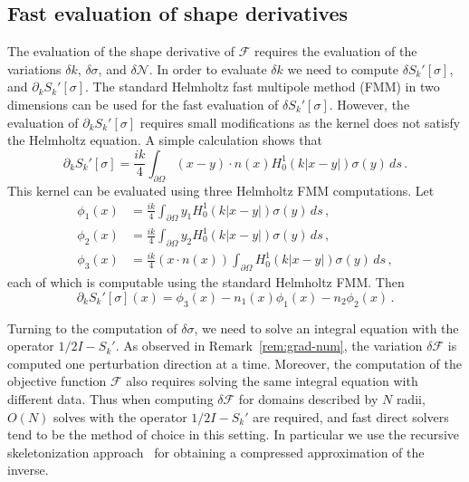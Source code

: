 \documentclass{amsart}
\theoremstyle{plain}
\begin{document}
\subsection{Fast evaluation of shape derivatives}
The evaluation of the shape derivative of $\mathcal{F}$ requires the evaluation of the variations $\delta k$, $\delta \sigma$, and $\delta \mathcal{N}$. 
In order to evaluate $\delta k$ we need to compute $\delta S_{k}'[\sigma]$, and $\partial_{k} S_{k}'[\sigma]$. The standard Helmholtz fast multipole method (FMM) in two
dimensions can be used for the fast evaluation of $\delta S_{k}'[\sigma]$. However, 
the evaluation of $\partial_{k} S_{k}'[\sigma]$ requires small modifications as the kernel does not satisfy the Helmholtz equation.
A simple calculation shows that
\begin{equation}
\partial_{k} S_{k}'[\sigma] = \frac{ik}{4}\int_{\partial \Omega}  (x-y)\cdot n(x) H_{0}^{1}(k|x-y|)\sigma(y) \, ds\,.
\end{equation}
This kernel can be evaluated using three Helmholtz FMM computations. Let 
\begin{equation}
\begin{aligned}
\phi_{1}(x)&= \frac{ik}{4}\int_{\partial \Omega}  y_{1} H_{0}^{1}(k|x-y|)\sigma(y) \, ds\,,\\
\phi_{2}(x)&= \frac{ik}{4}\int_{\partial \Omega}  y_{2} H_{0}^{1}(k|x-y|)\sigma(y) \, ds\,,\\
\phi_{3}(x)&= \frac{ik}{4}(x \cdot n(x))\int_{\partial \Omega}  H_{0}^{1}(k|x-y|)\sigma(y) \, ds\,,
\end{aligned}
\end{equation} 
each of which is computable using the standard Helmholtz FMM. Then
\begin{equation}
\partial_{k} S_{k}'[\sigma](x) = \phi_{3}(x) - n_{1}(x) \phi_{1}(x) - n_{2} \phi_{2}(x) \,. 
\end{equation}

Turning to the computation of $\delta \sigma$, we need to solve an integral equation with the operator $1/2I - S_{k}'$. As observed in Remark~\ref{rem:grad-num}, the variation $\delta \mathcal{F}$ is computed one perturbation
direction at a time. Moreover, the computation of the objective function $\mathcal{F}$ also requires solving the same integral equation with different data. Thus when computing $\delta \mathcal{F}$ for domains described by $N$ radii, $O(N)$ solves with the operator $1/2 I - S_{k}'$ are required, and fast direct solvers tend to be the method of choice in this setting. In particular we use the recursive skeletonization approach~\cite{rskel} for obtaining a compressed approximation of the inverse.
\end{document}

